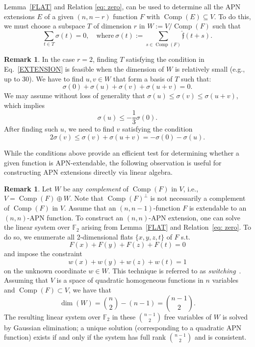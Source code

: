 \documentclass{amsart}[11pt]
\theoremstyle{plain}
\theoremstyle{definition}
\newtheorem{remark}[theorem]{Remark}
\numberwithin{theorem}{section}
\numberwithin{equation}{section}
\numberwithin{table}{section}
\numberwithin{figure}{section}
\numberwithin{algorithm}{section}
\def\F{\mathbb F}
\def\flat{{\mathfrak f}}
\begin{document}
Lemma~\ref{FLAT} and  Relation \ref{eq: zero}, can be used to determine all the APN extensions $E$ of a given $(n, n-r)$ function $F$  with $\operatorname{Comp}(E) \subseteq V$. To do this, we must choose a subspace $T$ of dimension $r$ in $W:= V/\operatorname{Comp}(F)$ such that 
\begin{equation}\label{EXTENSION}
	\sum_{t \in T}  \sigma(t)= 0,
    \quad
    \text{where}
    \ 
    \sigma(t) := \sum_{s\in\operatorname{Comp}(F)} \widehat{\flat}(t+s).
\end{equation}

\begin{remark}\label{rem:is_extendable}
	In the case $r=2$, finding $T$ satisfying the condition in Eq.~\eqref{EXTENSION} is feasible when the dimension of $W$ is relatively small (e.g., up to 30). We have to find $u,v\in W$ that form a basis of $T$ such that:
	\[
	\sigma(0) + \sigma(u) + \sigma(v) + \sigma(u + v) = 0.
	\]
	We may assume without loss of generality that $\sigma(u) \leq \sigma(v) \leq \sigma(u+v)$, which implies
	\begin{equation}\label{eq:extension_condition1}
	    \sigma(u) \leq -\frac{1}{3} \sigma(0).
	\end{equation}
    After finding such $u$, we need to find $v$ satisfying the condition
    \begin{equation}\label{eq:extension_condition2}
        2\sigma(v) \leq \sigma(v) + \sigma(u+v) = -\sigma(0) - \sigma(u).
    \end{equation}
\end{remark}


While the conditions above provide an efficient test for determining whether a given function is APN-extendable, the following observation is useful for constructing APN extensions directly via linear algebra.

\begin{remark}\label{rem:construct}
    Let $W$ be any \emph{complement} of $\operatorname{Comp}(F)$ in $V$, i.e., $V=\operatorname{Comp}(F)\oplus W$. Note that $\operatorname{Comp}(F)^\perp$ is not necessarily a complement of $\operatorname{Comp}(F)$ in $V$. Assume that an $(n,n-1)$-function $F$ is extendable to an $(n,n)$-APN function. To construct an $(n,n)$-APN extension, one can solve the linear system over $\mathbb{F}_2$ arising from Lemma~\ref{FLAT} and Relation~\ref{eq: zero}. To do so, we enumerate all 2-dimensional flats $\{ x,y,z,t \}$ of $F$ s.t. $$F(x)+F(y)+F(z)+F(t)=0$$ and impose the constraint $$w(x) + w(y) + w(z) + w(t) = 1$$ on the unknown coordinate $w\in W$. This technique is referred to as \emph{switching}~\cite{EdelP09}. Assuming that $V$ is a space of quadratic homogeneous functions in $n$ variables and $\operatorname{Comp}(F)\subset V$, we have that $$\dim(W)=\binom{n}{2} - (n-1) = \binom{n-1}{2}.$$ The resulting linear system over $\F_2$ in these $\binom{n-1}{2}$ free variables of $W$ is solved by Gaussian elimination; a unique solution (corresponding to a quadratic APN function) exists if and only if the system has full rank $\binom{n-1}{2}$ and is consistent.
\end{remark}
\end{document}
